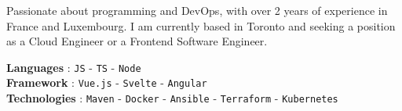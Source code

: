 \documentclass[8pt]{cv} %
\begin{document}
\vspace{0.5cm}




\begin{minipage}[t]{0.4\textwidth} %
	\vspace{-\baselineskip} %
	
	    Passionate about programming and DevOps, with over 2 years of experience in France and Luxembourg. I am currently based in Toronto and seeking a position as a Cloud Engineer or a Frontend Software Engineer.
\end{minipage}
\hfill %
\begin{minipage}[t]{0.5\textwidth} %
	\vspace{-\baselineskip} %
	
	\textbf{Languages}  : \texttt{JS} - \texttt{TS} - \texttt{Node}\\

	\textbf{Framework} :  \texttt{Vue.js} - \texttt{Svelte} - \texttt{Angular}\\
	
	\textbf{Technologies} :  \texttt{Maven} - \texttt{Docker} - \texttt{Ansible} - \texttt{Terraform} - \texttt{Kubernetes}\\

\end{minipage}



\end{document}
